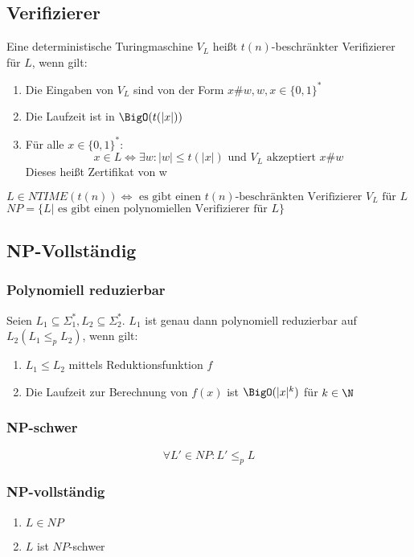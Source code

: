 \documentclass{article}
\begin{document}
\subsection{Verifizierer}
Eine deterministische Turingmaschine $V_L$ heißt $t(n)$-beschränkter Verifizierer für $L$, wenn gilt:
\begin{enumerate}
	\item Die Eingaben von $V_L$ sind von der Form $x\#w, w, x\in\{0,1\}^*$
	\item Die Laufzeit ist in $\BigO(t(|x|))$
	\item Für alle $x\in\{0,1\}^*$:
		$$
			x\in L\Leftrightarrow\exists w:|w|\leq t(|x|) \text{ und } V_L \text{ akzeptiert } x\#w
		$$
		Dieses heißt Zertifikat von w
\end{enumerate}
$L\in NTIME(t(n))\Leftrightarrow\text{ es gibt einen } t(n)\text{-beschränkten Verifizierer } V_L \text{ für } L$ \newline
$NP=\{L|\text{ es gibt einen polynomiellen Verifizierer für } L \}$
\subsection{NP-Vollständig}
\subsubsection{Polynomiell reduzierbar}
Seien $L_1\subseteq\Sigma_1^*,L_2\subseteq\Sigma_2^*$. \newline
$L_1$ ist genau dann polynomiell reduzierbar auf $L_2(L_1\leq_pL_2)$, wenn gilt: 
\begin{enumerate}
	\item $L_1\leq L_2$ mittels Reduktionsfunktion $f$
	\item Die Laufzeit zur Berechnung von $f(x)$ ist $\BigO(|x|^k)$ für $k\in\N$
\end{enumerate}
\subsubsection{NP-schwer}
$$
	\forall L'\in NP:L'\leq_pL
$$
\subsubsection{NP-vollständig}
\begin{enumerate}
	\item $L\in NP$
	\item $L$ ist $NP$-schwer
\end{enumerate}
\end{document}
